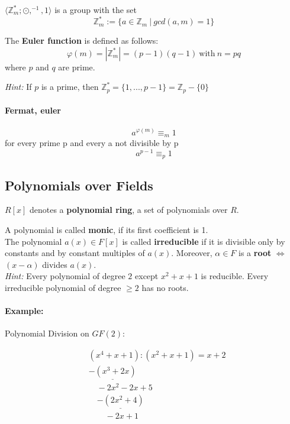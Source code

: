 \documentclass[11pt]{article}
\begin{document}
$\langle \mathbb{Z}_m^*; \odot, ^{-1}, 1\rangle$ is a group with the set
\begin{equation*}
	\mathbb{Z}_m^* := \{a \in \mathbb{Z}_m\ |\ gcd(a,m) = 1\}
\end{equation*}

The \textbf{Euler function} is defined as follows:
\begin{equation*}
	\varphi(m) = |\mathbb{Z}_m^*| = (p-1)(q-1)\ \text{with}\ n = pq
\end{equation*}
where $p$ and $q$ are prime.

\emph{Hint:} If $p$ is a prime, then $\mathbb{Z}_p^* = \{1,...,p-1\} = \mathbb{Z}_p - \{0\}$
\paragraph{Fermat, euler}
\begin{equation}
	a^{\varphi(m)}\equiv_m 1
\end{equation}
for every prime p and every a not divisible by p
\begin{equation}
	a^{p-1}\equiv_p 1
\end{equation}

\subsection{Polynomials over Fields}

$R[x]$ denotes a \textbf{polynomial ring}, a set of polynomials over $R$.

A polynomial is called \textbf{monic}, if its first coefficient is 1. \\
The polynomial $a(x) \in F[x]$ is called \textbf{irreducible} if it is divisible only by constants and by constant multiples of $a(x)$.
Moreover, $\alpha \in F$ is a \textbf{root} $\Leftrightarrow$ $(x-\alpha)$ divides $a(x)$. \\


\emph{Hint:} Every polynomial of degree $2$ except $x^2 + x + 1$ is reducible. Every irreducible polynomial of degree $\geq 2$  has no roots.

\paragraph{Example:} Polynomial Division on $GF(2)$:

\begin{equation*}
\begin{split}
	& (x^4+x+1) : (x^2+x+1) = x + 2 \\
	&\underline{-(x^3+2x)} \\
	& \quad -2x^2 -2x + 5 \\
	& \quad \underline{-(2x^2 + 4)} \\
	&\qquad -2x +1
\end{split}
\end{equation*}
\end{document}
